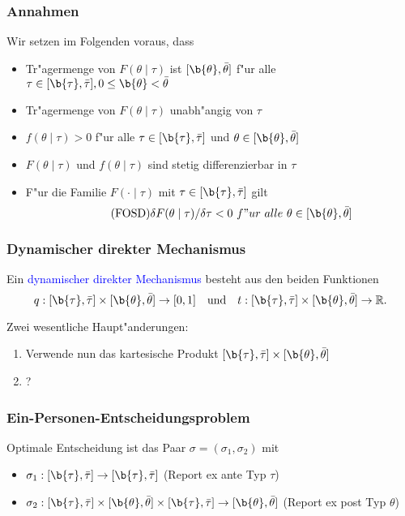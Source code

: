 \begin{frame}
  \frametitle{Annahmen}
  \justifying
  Wir setzen im Folgenden voraus, dass
  \begin{itemize}
    \item Tr"agermenge von $F(\theta \mid \tau)$ ist $[ \b{\theta} , \bar{\theta} ]$ f"ur alle
    $\tau \in [ \b{\tau} , \bar{\tau} ], 0 \leq \b{\theta} < \bar{\theta}$
    \item Tr"agermenge von $F(\theta \mid \tau)$ unabh"angig von $\tau$
    \item $f(\theta \mid \tau) > 0$ f"ur alle $\tau \in [ \b{\tau} , \bar{\tau} ]$
    und $\theta \in [ \b{\theta} , \bar{\theta} ]$
    \item $F(\theta \mid \tau)$ und $f(\theta \mid \tau)$ sind stetig differenzierbar in $\tau$
    \item F"ur die Familie $F( \cdot \mid \tau)$ mit $\tau \in [ \b{\tau} , \bar{\tau} ]$ gilt
    \begin{equation}
      \tag{FOSD}
      \delta F(\theta \mid \tau)/ \delta \tau < 0 \ f"ur \ alle \ \theta \in [ \b{\theta} , \bar{\theta} ]
    \end{equation}
  \end{itemize}
\end{frame}

\begin{frame}
  \frametitle{Dynamischer direkter Mechanismus}
  \justifying
  \begin{thmD}
    Ein \textcolor{blue}{dynamischer direkter Mechanismus} besteht aus den beiden Funktionen
    \begin{equation*}
      q:[ \b{\tau} , \bar{\tau} ] \times [ \b{\theta} , \bar{\theta} ] \rightarrow [0,1]
      \quad \text{und} \quad
      t:[ \b{\tau} , \bar{\tau} ] \times [ \b{\theta} , \bar{\theta} ] \rightarrow \mathbb{R}.
    \end{equation*}
  \end{thmD}
  Zwei wesentliche Haupt"anderungen:
  \begin{enumerate}
    \item Verwende nun das kartesische Produkt $[ \b{\tau} , \bar{\tau} ] \times [ \b{\theta} , \bar{\theta} ]$
    \item ?
  \end{enumerate}
\end{frame}

\begin{frame}
  \frametitle{Ein-Personen-Entscheidungsproblem}
  \justifying
  Optimale Entscheidung ist das Paar $\sigma = (\sigma_{1}, \sigma_{2})$ mit
  \begin{itemize}
    \item $\sigma_{1}: [ \b{\tau} , \bar{\tau} ] \rightarrow [ \b{\tau} , \bar{\tau} ]$ (Report ex ante Typ $\tau$)
    \item $\sigma_{2}: [ \b{\tau} , \bar{\tau} ] \times [ \b{\theta} , \bar{\theta} ]
    \times [ \b{\tau} , \bar{\tau} ]  \rightarrow [ \b{\theta} , \bar{\theta} ]$ (Report ex post Typ $\theta$)
  \end{itemize}
\end{frame}

